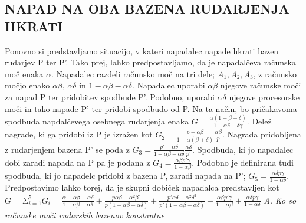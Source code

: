 \documentclass[12pt]{article}
\begin{document}
\subsection{NAPAD NA OBA BAZENA RUDARJENJA HKRATI}
Ponovno si predstavljamo situacijo, v kateri napadalec napade hkrati bazen rudarjev P ter P'. Tako prej, lahko predpostavljamo, da je napadalčeva računska moč enaka $\alpha$. Napadalec razdeli računsko moč na tri dele; $A_1, A_2, A_3$, z računsko močjo enako $\alpha\beta$, $\alpha\delta$ in $1 - \alpha\beta - \alpha\delta$. Napadalec uporabi $\alpha\beta$ njegove računske moči za napad P ter pridobitev spodbude P'. Podobno, uporabi $\alpha\delta$ njegove procesorske moči in tako napade P' ter pridobi spodbudo od P. Na ta način, bo pričakavoma spodbuda napdalčevega osebnega rudarjenja enaka $ G = \frac{\alpha(1 - \beta - \delta)}{1 - \alpha\delta - \delta\gamma}$. Delež nagrade, ki ga pridobi iz P je izražen kot $G_2 = \frac{p - \alpha\beta}{1 - \alpha(\beta + \delta)} \frac{\alpha\beta}{p}$. Nagrada pridobljena z rudarjenjem bazena P' se poda z $G_3 = \frac{p' - \alpha\delta}{1 - \alpha\beta - \alpha\delta} \frac{\alpha\delta}{p'}$. Spodbuda, ki jo napadalec dobi zaradi napada na P pa je podana z $G_4 = \frac{\alpha\beta p' \gamma}{1 - \alpha\beta}$. Podobno je definirana tudi spodbuda, ki jo napadelc pridobi z bazena P, zaradi napada na P'; $G_5 = \frac{\alpha\delta p \gamma}{1 - \alpha\delta}$. Predpostavimo lahko torej, da je skupni dobiček napadalca predstavljen kot $G = \Sigma_{i=1}^5 G_i = \frac{\alpha - \alpha\beta - \alpha\delta}{1 - \alpha\beta - \alpha\delta} + \frac{p \alpha\beta - \alpha^2\beta^2}{p(1 - \alpha\beta - \alpha\delta)} + \frac{p' \alpha\delta - \alpha^2\delta^2}{p'(1 - \alpha\beta - \alpha\delta)} + \frac{\alpha\beta p' \gamma}{1 - \alpha\beta} + \frac{\alpha\delta p \gamma}{1 - \alpha\delta}$
\newline
\newline
\textit{A. Ko so računske moči rudarskih bazenov konstantne}
\end{document}
